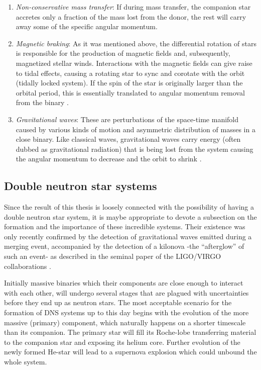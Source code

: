 \documentclass[../../main/thesis_msc.tex]{subfiles}
\begin{document}
				\begin{enumerate}[label=(\roman*)]
				
					\item \emph{Non-conservative mass transfer}: If during mass transfer, the companion star accretes only a fraction of the mass lost from the donor, the rest will carry away some of the specific angular momentum.
					\item \emph{Magnetic braking}: As it was mentioned above, the differential rotation of stars is responsible for the production of magnetic fields and, subsequently, magnetized stellar winds. Interactions with the magnetic fields can give raise to tidal effects, causing a rotating star to sync and corotate with the orbit (tidally locked system). If the spin of the star is originally larger than the orbital period, this is essentially translated to angular momentum removal from the binary \citep[see also][]{Rappaport1983}.
					\item \emph{Gravitational waves}:  These are perturbations of the space-time manifold caused by various kinds of motion and asymmetric distribution of masses in a close binary. Like classical waves, gravitational waves carry energy (often dubbed as gravitational radiation) that is being lost from the system causing the angular momentum to decrease and the orbit to shrink \citep[see also][]{Peters1964, Riles2013}.
				
				\end{enumerate}
				
				
			\subsection{Double neutron star systems}
			
				Since the result of this thesis is loosely connected with the possibility of having a double neutron star system, it is maybe appropriate to devote a subsection on the formation and the importance of these incredible systems. Their existence was only recently confirmed by the detection of gravitational waves emitted during a merging event, accompanied by the detection of a kilonova -the ``afterglow'' of such an event- as described in the seminal paper of the LIGO/VIRGO collaborations \citep{ligo}.
				
				Initially massive binaries which their components are close enough to interact with each other, will undergo several stages that are plagued with uncertainties before they end up as neutron stars. The most acceptable scenario for the formation of DNS systems up to this day begins with the evolution of the more massive (primary) component, which naturally happens on a shorter timescale than its companion. The primary star will fill its Roche-lobe transferring material to the companion star and exposing its helium core. Further evolution of the newly formed He-star will lead to a supernova explosion which could unbound the whole system. 
				
\end{document}
